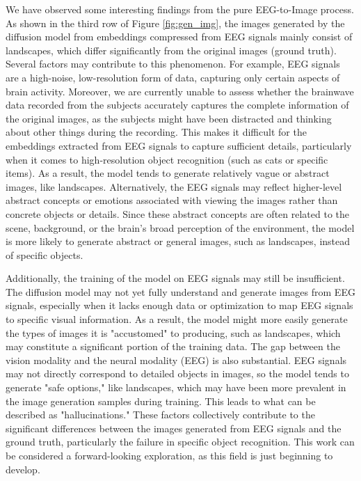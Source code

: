 \documentclass{article}
\begin{document}
We have observed some interesting findings from the pure EEG-to-Image process. As shown in the third row of Figure \ref{fig:gen_img}, the images generated by the diffusion model from embeddings compressed from EEG signals mainly consist of landscapes, which differ significantly from the original images (ground truth). Several factors may contribute to this phenomenon. For example, EEG signals are a high-noise, low-resolution form of data, capturing only certain aspects of brain activity. Moreover, we are currently unable to assess whether the brainwave data recorded from the subjects accurately captures the complete information of the original images, as the subjects might have been distracted and thinking about other things during the recording. This makes it difficult for the embeddings extracted from EEG signals to capture sufficient details, particularly when it comes to high-resolution object recognition (such as cats or specific items). As a result, the model tends to generate relatively vague or abstract images, like landscapes. Alternatively, the EEG signals may reflect higher-level abstract concepts or emotions associated with viewing the images rather than concrete objects or details. Since these abstract concepts are often related to the scene, background, or the brain’s broad perception of the environment, the model is more likely to generate abstract or general images, such as landscapes, instead of specific objects.

Additionally, the training of the model on EEG signals may still be insufficient. The diffusion model may not yet fully understand and generate images from EEG signals, especially when it lacks enough data or optimization to map EEG signals to specific visual information. As a result, the model might more easily generate the types of images it is "accustomed" to producing, such as landscapes, which may constitute a significant portion of the training data. The gap between the vision modality and the neural modality (EEG) is also substantial. EEG signals may not directly correspond to detailed objects in images, so the model tends to generate "safe options," like landscapes, which may have been more prevalent in the image generation samples during training. This leads to what can be described as "hallucinations." These factors collectively contribute to the significant differences between the images generated from EEG signals and the ground truth, particularly the failure in specific object recognition. This work can be considered a forward-looking exploration, as this field is just beginning to develop.
\end{document}
